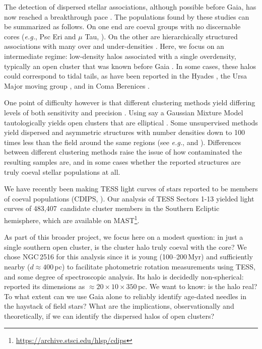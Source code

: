 \documentclass[12pt,twocolumn,tighten]{aastex63}
\newcommand{\numsouthernuniqlcs}{483{,}407\ } %
\begin{document}
The detection of dispersed stellar associations, although possible
before Gaia, has now reached a breakthrough pace \citep[{\it
e.g.},][]{de_zeeuw_hipparcos_1999,bergond_gravitational_2001,zuckerman_young_2004,oh_comoving_2017,cantatgaudin_gaia_2018,gagne_banyan_XII_2018,gagne_banyan_XIII_2018,kounkel_apogee2_2018,zari_3d_2018,kounkel_untangling_2019,furnkranz_comabernbhr_2019}.
The populations found by these studies can be summarized as follows.
On one end are coeval groups with no discernable cores ({\it e.g.},
Psc Eri and $\mu$ Tau,
\citealt{meingast_psceri_2019,curtis_tess_2019,gagne_mutau_2020}).  On
the other are hierarchically structured associations with many over
and under-densities  \citep[{\it e.g.} the Sco-Cen and Vela
associations][]{pecaut_star_2016,cantatgaudin_velaOB2_2019}.  Here, we focus on
an intermediate regime: low-density halos associated with a single
overdensity, typically an open cluster that was known before Gaia
\citep[see][]{kounkel_untangling_2019,kounkel_untanglingII_2020,meingast_2021}.
In some cases, these halos could correspond to tidal tails, as have
been reported in the Hyades
\citep{meingast_hyades_2019,roser_hyades_2019}, the Ursa Major moving
group \citep{gagne_lowmassUMA_2020}, and in Coma Berenices
\citep{tang_comaber_2019}. 

One point of difficulty however is that different clustering methods
yield differing levels of both sensitivity and precision
\citep{hunt_clustering_2020}.  Using say a Gaussian Mixture Model
tautologically yields open clusters that are elliptical \citep[{\it
e.g.},][]{wallace_m4_2018}.  Some unsupervised methods yield dispersed
and asymmetric structures with number densities down to 100 times less
than the field around the same regions (see {\it e.g.},
\citealt{kounkel_untangling_2019} and \citealt{meingast_2021}).
Differences between different clustering methods raise the issue of
how contaminated the resulting samples are, and in some cases whether
the reported structures are truly coeval stellar populations at all.

We have recently been making TESS light curves of stars reported to be
members of coeval populations (CDIPS, \citealt{bouma_cdipsI_2019}).
Our analysis of TESS Sectors 1-13 yielded light curves of
\numsouthernuniqlcs candidate cluster members in the Southern Ecliptic
hemisphere, which are available on
MAST\footnote{\url{https://archive.stsci.edu/hlsp/cdips}}.

As part of this broader project, we focus here on a modest question:
in just a single southern open cluster, is the cluster halo truly
coeval with the core?  We chose NGC\,2516 for this analysis since it
is young (100--200\,Myr) and sufficiently nearby ($d\approx400$\,pc)
to facilitate photometric rotation measurements using TESS, and some
degree of spectroscopic analysis.  Its halo is decidedly
non-spherical: \citet{kounkel_untangling_2019} reported its dimensions
as $\approx20\times10\times350$\,pc.  We want to know: is the halo
real? To what extent can we use Gaia alone to reliably identify
age-dated needles in the haystack of field stars?  What are the
implications, observationally and theoretically, if we can identify
the dispersed halos of open clusters?
\end{document}
